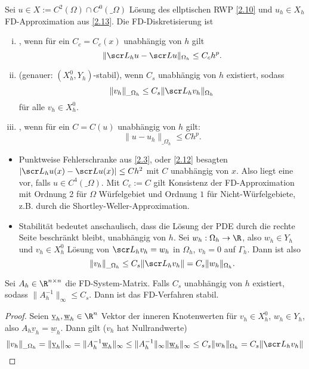 \begin{df} \label{2.21}
	Sei $u \in X := C^2(\Omega) \cap C^0(\_\Omega)$ Lösung des ellptischen RWP \ref{2.10} und $u_h \in X_h$ FD-Approximation aus \ref{2.13}.
	Die FD-Diskretisierung ist
	\begin{enumerate}[i)]
		\item
			, wenn für ein $C_c = C_c(x)$ unabhängig von $h$ gilt
			\[
				\|\scr L_h u - \scr L u\|_{\Omega_h} \le C_c h^p.
			\]
		\item
			 (genauer: $(X_h^0, Y_h)$-stabil), wenn $C_s$ unabhängig von $h$ existiert, sodass
			\[
				\|v_h\|_{\_\Omega_h} \le C_s \|\scr L_h v_h\|_{\Omega_h}
			\]
			für alle $v_h \in X_h^0$.
		\item
			, wenn für ein $C = C(u)$ unabhängig von $h$ gilt:
			\[
				\|u - u_h\|_{\_\Omega_h} \le C h^p.
			\]
	\end{enumerate}
	\begin{note}
		\begin{itemize}
			\item
				Punktweise Fehlerschranke aus \ref{2.3}, oder \ref{2.12} besagten $|\scr L_h u(x) - \scr L u(x)| \le C h^2$ mit $C$ unabhängig von $x$.
				Also liegt eine  vor, falls $u \in C^4(\_\Omega)$. 
				Mit $C_c := C$ gilt Konsistenz der FD-Approximation mit Ordnung 2 für $\Omega$ Würfelgebiet und Ordnung $1$ für Nicht-Würfelgebiete, z.B. durch die Shortley-Weller-Approximation.
		\end{itemize}
	\end{note}
	\begin{note}[Stabilität]
		\begin{itemize}
			\item
				Stabilität bedeutet anschaulisch, dass die Lösung der PDE durch die rechte Seite beschränkt bleibt, unabhängig von $h$.
				Sei $w_h: \Omega_h \to \R$, also $w_h \in Y_h$ und $v_h \in X_h^0$ Lösung von $\scr L_h v_h = w_h$ in $\Omega_h$, $v_h = 0$ auf $\Gamma_h$.
				Dann ist also
				\[
					\|v_h\|_{\_\Omega_h} \le C_s \|\scr L_h v_h\| = C_s \|w_h\|_{\Omega_h}.
				\]
		\end{itemize}		
	\end{note}
\end{df}

\begin{st} \label{2.22}
	Sei $A_h \in \R^{n\times n}$ die FD-System-Matrix.
	Falls $C_s$ unabhängig von $h$ existiert, sodass $\|A_h^{-1}\|_\infty \le C_s$.
	Dann ist das FD-Verfahren stabil.
	\begin{proof}
		Seien $\underbar{v}_h, \underbar{w}_h \in \R^n$ Vektor der inneren Knotenwerten für $v_h \in X_h^0$, $w_h \in Y_h$, also $A_h \underbar{v}_h = \underbar{w}_h$.
		Dann gilt ($v_h$ hat Nullrandwerte)
		\[
			\|v_h\|_{\_\Omega_h}
			= \|\underbar{v}_h\|_\infty
			= \|A_h^{-1} \underbar{w}_h\|_\infty
			\le \|A_h^{-1}\|_\infty \|\underbar{w}_h\|_\infty
			\le C_s \|w_h\|_{\Omega_h}
			= C_s \|\scr L_h v_h\|
		\]
	\end{proof}
\end{st}

